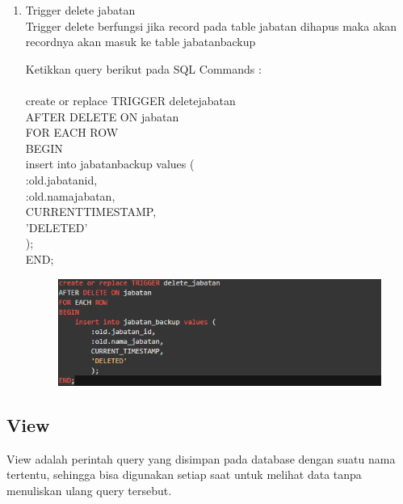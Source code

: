 \documentclass[12pt, times new roman, a4paper]{report}
\begin{document}
\begin{enumerate}
\item Trigger delete jabatan\\
Trigger delete berfungsi jika record pada table jabatan dihapus maka akan recordnya akan masuk ke table jabatan\textunderscore backup\\
\par Ketikkan query berikut pada SQL Commands :\\
\\
create or replace TRIGGER delete\textunderscore jabatan\\
AFTER DELETE ON jabatan\\
FOR EACH ROW\\
BEGIN\\
    insert into jabatan\textunderscore backup values (\\
        :old.jabatan\textunderscore id,\\
        :old.nama\textunderscore jabatan,\\
        CURRENT\textunderscore TIMESTAMP,\\
        'DELETED'\\
        );\\
END;
\begin{figure}[h]
	\centering
		\includegraphics[scale=0.7]{gambar/19}
\end{figure}
\end{enumerate}

\subsection{View}
\hspace{1cm} View adalah perintah query yang disimpan pada database dengan suatu nama tertentu, sehingga bisa digunakan setiap saat untuk melihat data tanpa menuliskan ulang query tersebut.
\end{document}
